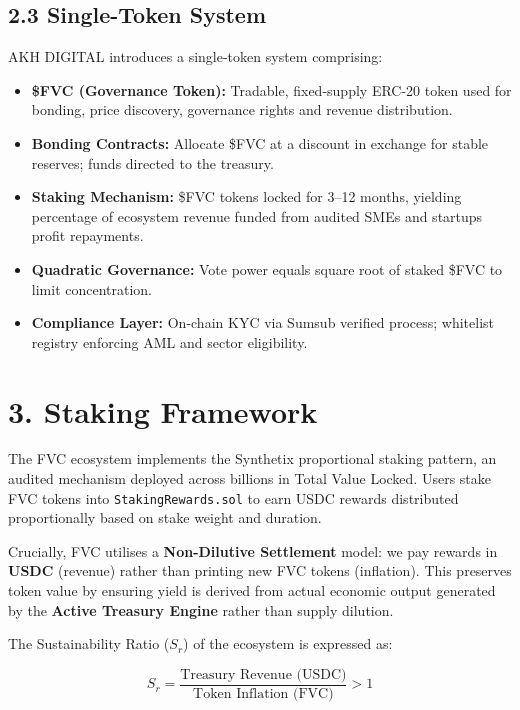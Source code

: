 \documentclass[
  paper=a4,
  ,captions=tableheading
]{scrartcl}
\providecommand{\tightlist}{%
  \setlength{\itemsep}{0pt}\setlength{\parskip}{0pt}}
\begin{document}
\subsection{2.3 Single-Token System}\label{single-token-system}

AKH DIGITAL introduces a single-token system comprising:

\begin{itemize}
\tightlist
\item{\textbf{\$FVC (Governance Token):}} Tradable, fixed-supply ERC-20 token used for bonding, price discovery, governance rights and revenue distribution.
\item
  \textbf{Bonding Contracts:} Allocate \$FVC at a discount in exchange
  for stable reserves; funds directed to the treasury.
\item
  \textbf{Staking Mechanism:} \$FVC tokens locked for 3--12 months,
  yielding percentage of ecosystem revenue funded from audited SMEs and startups profit repayments.
\item
  \textbf{Quadratic Governance:} Vote power equals square root of staked
  \$FVC to limit concentration.
\item
  \textbf{Compliance Layer:} On-chain KYC via Sumsub verified process;
  whitelist registry enforcing AML and sector eligibility.
\end{itemize}

\section{3. Staking Framework}\label{staking-framework}

The FVC ecosystem implements the Synthetix proportional staking pattern, an audited mechanism deployed across billions in Total Value Locked. Users stake FVC tokens into \texttt{StakingRewards.sol} to earn USDC rewards distributed proportionally based on stake weight and duration.

Crucially, FVC utilises a \textbf{Non-Dilutive Settlement} model: we pay rewards in \textbf{USDC} (revenue) rather than printing new FVC tokens (inflation). This preserves token value by ensuring yield is derived from actual economic output generated by the \textbf{Active Treasury Engine} rather than supply dilution.

The Sustainability Ratio ($S_r$) of the ecosystem is expressed as:

\[
S_r = \frac{\text{Treasury Revenue (USDC)}}{\text{Token Inflation (FVC)}} > 1
\]
\end{document}

